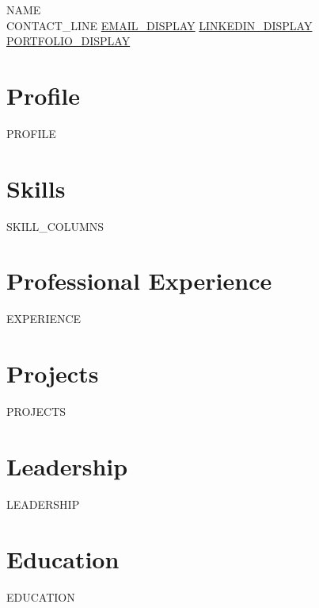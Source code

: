 \documentclass[9pt, letterpaper]{article}
\begin{document}
{{NAME}}\\
{{CONTACT_LINE}} \textbar{} \href{mailto:{{EMAIL_URL}}}{{{EMAIL_DISPLAY}}} \textbar{} \href{{{LINKEDIN_URL}}}{{{LINKEDIN_DISPLAY}}} \textbar{} \href{{{PORTFOLIO_URL}}}{{{PORTFOLIO_DISPLAY}}}

\section*{Profile}
{{PROFILE}}

\section*{Skills}
{{SKILL_COLUMNS}}

\section*{Professional Experience}
{{EXPERIENCE}}

\section*{Projects}
{{PROJECTS}}

\section*{Leadership}
{{LEADERSHIP}}

\section*{Education}
{{EDUCATION}}
\end{document}
